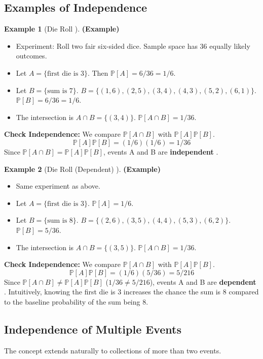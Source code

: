 \documentclass[12pt, a4paper]{article}
\theoremstyle{definition}
\newtheorem{example}{Example}[section] %
\theoremstyle{plain}
\newcommand{\Prob}[1]{\mathbb{P}\left[#1\right]} %
\newcommand{\intersect}{\cap} %
\begin{document}
\subsection{Examples of Independence}

\begin{example}[Die Roll \cite{Chan, Ross}]
\textbf{(Example)}
\begin{itemize}
    \item Experiment: Roll two fair six-sided dice. Sample space has 36 equally likely outcomes.
    \item Let $A = \{\text{first die is 3}\}$. Then $\Prob{A} = 6/36 = 1/6$.
    \item Let $B = \{\text{sum is 7}\}$. $B = \{(1,6), (2,5), (3,4), (4,3), (5,2), (6,1)\}$. $\Prob{B} = 6/36 = 1/6$.
    \item The intersection is $A \intersect B = \{(3,4)\}$. $\Prob{A \intersect B} = 1/36$.
\end{itemize}
\textbf{Check Independence:} We compare $\Prob{A \intersect B}$ with $\Prob{A}\Prob{B}$.
\[ \Prob{A}\Prob{B} = (1/6)(1/6) = 1/36 \]
Since $\Prob{A \intersect B} = \Prob{A}\Prob{B}$, events A and B are \textbf{independent} \cite{Chan, Ross}.
\end{example}

\begin{example}[Die Roll (Dependent) \cite{Ross, Chan}]
\textbf{(Example)}
\begin{itemize}
    \item Same experiment as above.
    \item Let $A = \{\text{first die is 3}\}$. $\Prob{A} = 1/6$.
    \item Let $B = \{\text{sum is 8}\}$. $B = \{(2,6), (3,5), (4,4), (5,3), (6,2)\}$. $\Prob{B} = 5/36$.
    \item The intersection is $A \intersect B = \{(3,5)\}$. $\Prob{A \intersect B} = 1/36$.
\end{itemize}
\textbf{Check Independence:} We compare $\Prob{A \intersect B}$ with $\Prob{A}\Prob{B}$.
\[ \Prob{A}\Prob{B} = (1/6)(5/36) = 5/216 \]
Since $\Prob{A \intersect B} \neq \Prob{A}\Prob{B}$ ($1/36 \neq 5/216$), events A and B are \textbf{dependent} \cite{Chan}. Intuitively, knowing the first die is 3 increases the chance the sum is 8 compared to the baseline probability of the sum being 8.
\end{example}

\subsection{Independence of Multiple Events}
The concept extends naturally to collections of more than two events.
\end{document}

